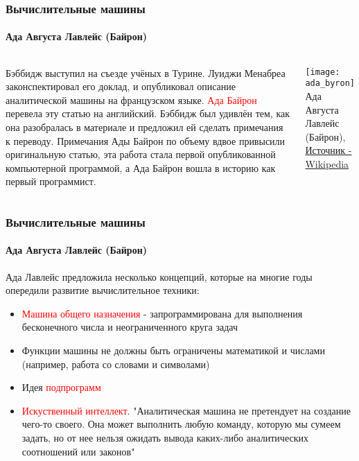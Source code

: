 \documentclass[aspectratio=169]{beamer}
\begin{document}
\begin{frame}
\frametitle{Вычислительные машины}
\framesubtitle{Ада Августа Лавлейс (Байрон)}
\begin{block}{}
\begin{columns}[]
\column{\dimexpr\linewidth-30mm}
\justifying
Бэббидж выступил на съезде учёных в Турине. Луиджи Менабреа законспектировал его доклад, и опубликовал описание аналитической машины на французском языке.\newline\newline
\textcolor{red}{Ада Байрон} перевела эту статью на английский. Бэббидж был удивлён тем, как она разобралась в материале и предложил ей сделать примечания к переводу.\newline\newline
Примечания Ады Байрон по объему вдвое привысили оригинальную статью, эта работа стала первой опубликованной компьютерной программой, а Ада Байрон вошла в историю как первый программист. 

\column{30mm}

\texttt{[image: ada\_byron]}
\tiny Ада Августа Лавлейс (Байрон), \href{https://en.wikipedia.org/wiki/Ada_Lovelace}{Источник - Wikipedia} 
\end{columns}
\end{block}
\end{frame}

\begin{frame}
\frametitle{Вычислительные машины}
\framesubtitle{Ада Августа Лавлейс (Байрон)}
\justifying
Ада Лавлейс предложила несколько концепций, которые на многие годы опередили развитие вычислительное техники:
\begin{itemize}
\item{\textcolor{red}{Машина общего назначения} - запрограммирована для выполнения бесконечного числа и неограниченного круга задач}
\item{Функции машины не должны быть ограничены математикой и числами (например, работа со словами и символами)}
\item{Идея \textcolor{red}{подпрограмм}}
\item{\textcolor{red}{Искуственный интеллект}. "Аналитическая машина не претендует на создание чего-то своего. Она может выполнить любую команду, которую мы сумеем задать, но от нее нельзя ожидать вывода каких-либо аналитических соотношений или законов"}
\end{itemize}
\end{frame}
\end{document}
